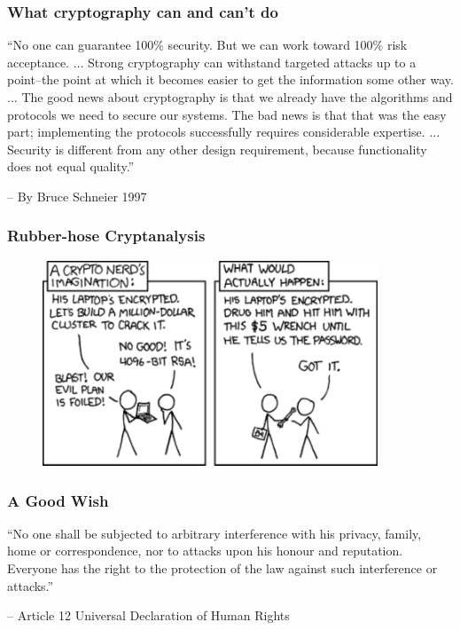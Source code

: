 \begin{frame}\frametitle{What cryptography can and can't do}
``No one can guarantee 100\% security. But we can work toward 100\% risk acceptance. $\dots$ Strong cryptography can withstand targeted attacks up to a point--the point at which it becomes easier to get the information some other way. $\dots$ The good news about cryptography is that we already have the algorithms and protocols we need to secure our systems. The bad news is that that was the easy part; implementing the protocols successfully requires considerable expertise. $\dots$  
Security is different from any other design requirement, because functionality does not equal quality.''
\newline

-- By Bruce Schneier 1997
\end{frame}
\begin{frame}\frametitle{Rubber-hose Cryptanalysis}
\begin{figure}
\begin{center}
\includegraphics[width=100mm]{pic/rubberhose} 
\end{center}
\end{figure}
\end{frame}
\begin{frame}\frametitle{A Good Wish}
``No one shall be subjected to arbitrary interference with his privacy, family, home or correspondence, nor to attacks upon his honour and reputation. Everyone has the right to the protection of the law against such interference or attacks.''
\newline

-- Article 12 Universal Declaration of Human Rights
\end{frame}
